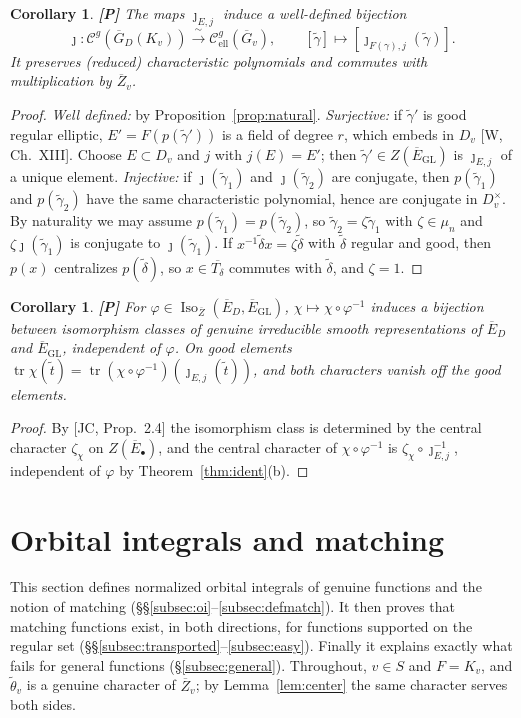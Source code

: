 \documentclass[12pt]{article}
\newcommand{\ov}[1]{\overline{#1}}
\newcommand{\tr}{\operatorname{tr}}
\newcommand{\Iso}{\operatorname{Iso}}
\newcommand{\GL}{\mathrm{GL}}
\newcommand{\Gb}{\ov{G}}
\newcommand{\Zb}{\ov{Z}}
\newcommand{\GDb}{\ov{G}_D}
\newcommand{\Eb}{\ov{E}}
\newcommand{\jj}{\jmath}
\newcommand{\Pv}{\textbf{[P]}}
\theoremstyle{plain}
\newtheorem{corollary}[theorem]{Corollary}
\theoremstyle{definition}
\begin{document}
\begin{corollary}\label{cor:classes}\Pv
The maps $\jj_{E,j}$ induce a well-defined bijection
\[ \jj:\mathcal C^{g}(\GDb(K_v))\xrightarrow{\ \sim\ }\mathcal C^{g}_{\mathrm{ell}}(\Gb_v),\qquad [\tilde\gamma]\mapsto[\jj_{F(\gamma),j}(\tilde\gamma)]. \]
It preserves (reduced) characteristic polynomials and commutes with multiplication by $\Zb_v$.
\end{corollary}
\begin{proof}
\emph{Well defined:} by Proposition~\ref{prop:natural}. \emph{Surjective:} if $\tilde\gamma'$ is good regular elliptic, $E'=F(p(\tilde\gamma'))$ is a field of degree $r$, which embeds in $D_v$ [W, Ch.~XIII]. Choose $E\subset D_v$ and $j$ with $j(E)=E'$; then $\tilde\gamma'\in Z(\Eb_{\GL})$ is $\jj_{E,j}$ of a unique element. \emph{Injective:} if $\jj(\tilde\gamma_1)$ and $\jj(\tilde\gamma_2)$ are conjugate, then $p(\tilde\gamma_1)$ and $p(\tilde\gamma_2)$ have the same characteristic polynomial, hence are conjugate in $D_v^\times$. By naturality we may assume $p(\tilde\gamma_1)=p(\tilde\gamma_2)$, so $\tilde\gamma_2=\zeta\tilde\gamma_1$ with $\zeta\in\mu_n$ and $\zeta\jj(\tilde\gamma_1)$ is conjugate to $\jj(\tilde\gamma_1)$. If $x^{-1}\tilde\delta x=\zeta\tilde\delta$ with $\tilde\delta$ regular and good, then $p(x)$ centralizes $p(\tilde\delta)$, so $x\in\ov{T_\delta}$ commutes with $\tilde\delta$, and $\zeta=1$.
\end{proof}

\begin{corollary}\label{cor:reps}\Pv
For $\varphi\in\Iso_{\Zb}(\Eb_D,\Eb_{\GL})$, $\chi\mapsto\chi\circ\varphi^{-1}$ induces a bijection between isomorphism classes of genuine irreducible smooth representations of $\Eb_D$ and $\Eb_{\GL}$, independent of $\varphi$. On good elements $\tr\chi(\tilde t)=\tr(\chi\circ\varphi^{-1})(\jj_{E,j}(\tilde t))$, and both characters vanish off the good elements.
\end{corollary}
\begin{proof}
By [JC, Prop.~2.4] the isomorphism class is determined by the central character $\zeta_\chi$ on $Z(\Eb_\bullet)$, and the central character of $\chi\circ\varphi^{-1}$ is $\zeta_\chi\circ\jj_{E,j}^{-1}$, independent of $\varphi$ by Theorem~\ref{thm:ident}(b).
\end{proof}

\section{Orbital integrals and matching}\label{sec:matching}
This section defines normalized orbital integrals of genuine functions and the notion of matching (\S\S\ref{subsec:oi}--\ref{subsec:defmatch}). It then proves that matching functions exist, in both directions, for functions supported on the regular set (\S\S\ref{subsec:transported}--\ref{subsec:easy}). Finally it explains exactly what fails for general functions (\S\ref{subsec:general}). Throughout, $v\in S$ and $F=K_v$, and $\tilde\theta_v$ is a genuine character of $\Zb_v$; by Lemma~\ref{lem:center} the same character serves both sides.
\end{document}
